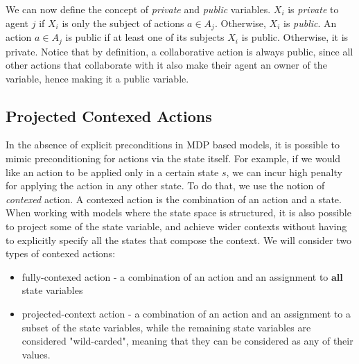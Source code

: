 \documentclass[letterpaper]{article} %
\begin{document}
We can now define the concept of {\em private} and {\em public} variables.
$X_i$ is {\em private} to agent $j$ if $X_i$ is only the subject of actions $a\in A_j$. 
Otherwise, $X_i$ is {\em public}. 
An action $a\in A_j$ is public if at least one of its subjects $X_i$ is public. Otherwise, it is private.
Notice that by definition, a collaborative action is always public, since all other actions that collaborate with it also make their agent an owner of the variable, hence making it a public variable.

\subsection{Projected Contexed Actions}
In the absence of explicit preconditions in MDP based models, it is possible to mimic preconditioning for actions via the state itself. For example, if we would like an action to be applied only in a certain state $s$, we can incur high penalty for applying the action in any other state.
To do that, we use the notion of \emph{contexed} action. A contexed action is the combination of an action and a state. When working with models where the state space is structured, it is also possible to project some of the state variable, and achieve wider contexts without having to explicitly specify all the states that compose the context.
We will consider two types of contexed actions:
\begin{itemize}
\item fully-contexed action - a combination of an action and an assignment to $\mathbf{all}$ state variables
\item projected-context action - a combination of an action and an assignment to a subset of the state variables, while the remaining state variables are considered "wild-carded", meaning that they can be considered as any of their values.
\end{itemize} 
\end{document}

